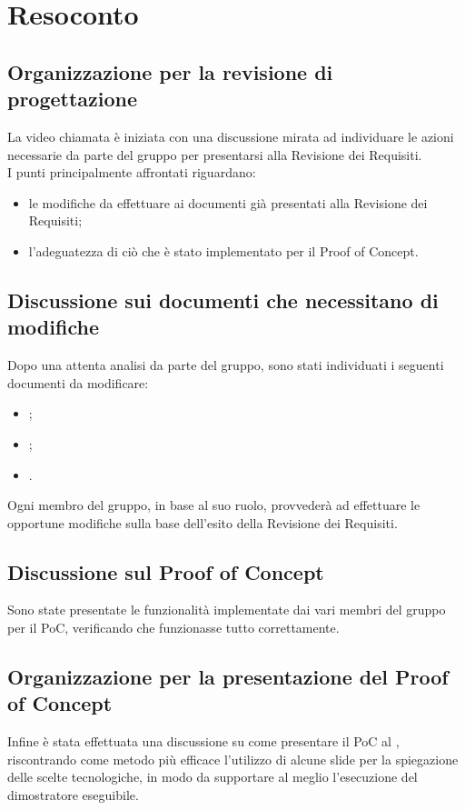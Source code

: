\section{Resoconto}
\subsection{Organizzazione per la revisione di progettazione}
La video chiamata è iniziata con una discussione mirata ad individuare le azioni necessarie da parte del gruppo per presentarsi alla Revisione dei Requisiti. \\
I punti principalmente affrontati riguardano:
\begin{itemize}
\item le modifiche da effettuare ai documenti già presentati alla Revisione dei Requisiti;
\item l'adeguatezza di ciò che è stato implementato per il Proof of Concept.
\end{itemize}
\subsection{Discussione sui documenti che necessitano di modifiche}
Dopo una attenta analisi da parte del gruppo, sono stati individuati i seguenti documenti da modificare:
\begin{itemize}
\item {};
\item {};
\item {}.
\end{itemize}
Ogni membro del gruppo, in base al suo ruolo, provvederà ad effettuare le opportune modifiche sulla base dell'esito della Revisione dei Requisiti.
\subsection{Discussione sul Proof of Concept}
Sono state presentate le funzionalità implementate dai vari membri del gruppo per il PoC, verificando che funzionasse tutto correttamente.
\subsection{Organizzazione per la presentazione del Proof of Concept}
Infine è stata effettuata una discussione su come presentare il PoC al \CR , riscontrando come metodo più efficace l'utilizzo di alcune slide per la spiegazione delle scelte tecnologiche, in modo da supportare al meglio l'esecuzione del dimostratore eseguibile.